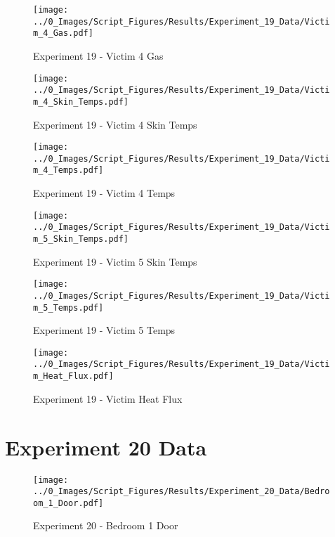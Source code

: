 	\begin{figure}[H]
		\centering
		\texttt{[image: ../0\_Images/Script\_Figures/Results/Experiment\_19\_Data/Victim\_4\_Gas.pdf]}
		\caption[]{Experiment 19 - Victim 4 Gas}
	\end{figure}
 
	\clearpage

	\begin{figure}[H]
		\centering
		\texttt{[image: ../0\_Images/Script\_Figures/Results/Experiment\_19\_Data/Victim\_4\_Skin\_Temps.pdf]}
		\caption[]{Experiment 19 - Victim 4 Skin Temps}
	\end{figure}
 

	\begin{figure}[H]
		\centering
		\texttt{[image: ../0\_Images/Script\_Figures/Results/Experiment\_19\_Data/Victim\_4\_Temps.pdf]}
		\caption[]{Experiment 19 - Victim 4 Temps}
	\end{figure}
 
	\clearpage

	\begin{figure}[H]
		\centering
		\texttt{[image: ../0\_Images/Script\_Figures/Results/Experiment\_19\_Data/Victim\_5\_Skin\_Temps.pdf]}
		\caption[]{Experiment 19 - Victim 5 Skin Temps}
	\end{figure}
 

	\begin{figure}[H]
		\centering
		\texttt{[image: ../0\_Images/Script\_Figures/Results/Experiment\_19\_Data/Victim\_5\_Temps.pdf]}
		\caption[]{Experiment 19 - Victim 5 Temps}
	\end{figure}
 
	\clearpage

	\begin{figure}[H]
		\centering
		\texttt{[image: ../0\_Images/Script\_Figures/Results/Experiment\_19\_Data/Victim\_Heat\_Flux.pdf]}
		\caption[]{Experiment 19 - Victim Heat Flux}
	\end{figure}
 

\clearpage		\large
\section{Experiment 20 Data} \label{App:Exp20Results} 

	\begin{figure}[H]
		\centering
		\texttt{[image: ../0\_Images/Script\_Figures/Results/Experiment\_20\_Data/Bedroom\_1\_Door.pdf]}
		\caption[]{Experiment 20 - Bedroom 1 Door}
	\end{figure}
 

